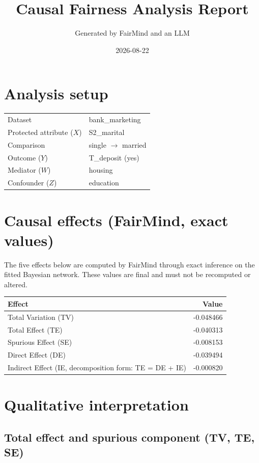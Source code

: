 \documentclass[11pt]{article}
\title{Causal Fairness Analysis Report}
\author{Generated by FairMind and an LLM}
\date{2026-08-22}
\begin{document}
\maketitle

\section{Analysis setup}

\begin{tabular}{ll}
\toprule
Dataset & bank\_marketing \\
Protected attribute ($X$) & S2\_marital \\
Comparison & single $\to$ married \\
Outcome ($Y$) & T\_deposit (yes) \\
Mediator ($W$) & housing \\
Confounder ($Z$) & education \\
\bottomrule
\end{tabular}

\section{Causal effects (FairMind, exact values)}

The five effects below are computed by FairMind through exact inference on the
fitted Bayesian network. These values are final and must not be recomputed or
altered.

\begin{tabular}{lr}
\toprule
Effect & Value \\
\midrule
Total Variation (TV) & -0.048466 \\
Total Effect (TE) & -0.040313 \\
Spurious Effect (SE) & -0.008153 \\
Direct Effect (DE) & -0.039494 \\
Indirect Effect (IE, decomposition form: TE = DE + IE) & -0.000820 \\
\bottomrule
\end{tabular}

\section{Qualitative interpretation}

\subsection{Total effect and spurious component (TV, TE, SE)}
\end{document}

